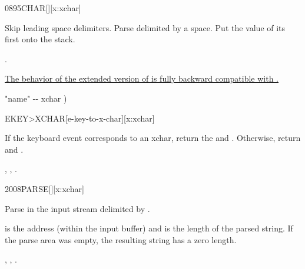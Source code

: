 \begin{worddef*}{0895}{CHAR}[][x:xchar]
\item {}

	Skip leading space delimiters.  Parse  delimited by a space.
	Put the value of its first  onto the stack.

\see {}.

	\begin{rationale}
	\uline{%
		The behavior of the extended version of  is fully backward
		compatible with .}
	\end{rationale}

	\begin{implement}
	\word{:}   "name" -{}- xchar )
		      \word{;}
	\end{implement}
\end{worddef*}


\begin{worddef*}[EKEYtoXCHAR]{}{EKEY>XCHAR}[e-key-to-x-char][x:xchar]
\item {}

	If the keyboard event  corresponds to an xchar, return the
	 and .  Otherwise, return  and
	.

\see {},
	,
	.
\end{worddef*}


\begin{worddef*}{2008}{PARSE}[][x:xchar]
\item {}

  Parse  in the input stream delimited by .

	 is the address (within the input buffer) and 
	is the length of the parsed string. If the parse area was empty, the
	resulting string has a zero length.

\see {},
	,
	.
\end{worddef*}


